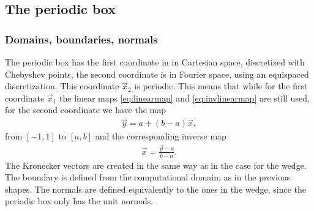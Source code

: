 \documentclass[11pt, a4paper]{article}
\theoremstyle{definition}
\begin{document}
\subsection{The periodic box}
\subsubsection{Domains, boundaries, normals}
The periodic box has the first coordinate in in Cartesian space, discretized with Chebyshev points, the second coordinate is in Fourier space, using an equispaced discretization. This coordinate $\vec x_2$ is periodic. 
This means that while for the first coordinate $\vec x_1$ the linear maps \eqref{eq:linearmap} and \eqref{eq:invlinearmap} are still used, for the second coordinate we have the map 
\begin{align*}
	\vec y = a + (b-a) \vec x, 
\end{align*}
from $[-1,1]$ to $[a,b]$ and the corresponding inverse map
\begin{align*}
   \vec x = \frac{\vec y- a}{b-a}.
\end{align*}
The Kronecker vectors are created in the same way as in the case for the wedge.
\\
The boundary is defined from the computational domain, as in the previous shapes. The normals are defined equivalently to the ones in the wedge, since the periodic box only has the unit normals.
\end{document}
